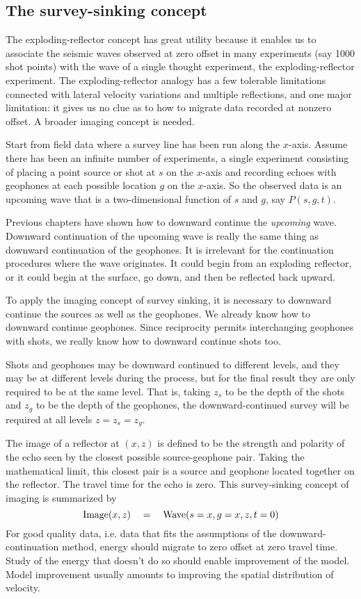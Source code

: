 \subsection{The survey-sinking concept}
\par
The exploding-reflector concept has great utility because it
enables us to associate the seismic waves
observed at zero offset in many experiments
(say 1000 shot points) with the wave of a single thought experiment,
the exploding-reflector experiment.
The exploding-reflector analogy has a
few tolerable limitations connected with lateral velocity
variations and multiple reflections,
and one major limitation:
it gives us no clue as to
how to migrate data recorded at nonzero offset.
A broader imaging concept is needed.
\par
Start from field data where a 
survey line has been run along the  $x$-axis.
Assume there has been an infinite number of experiments,
a single experiment consisting of placing  a point
source or shot at  $s$  on the $x$-axis and 
recording echoes with geophones
at each possible location  $g$  on the $x$-axis.
So the observed data is an upcoming wave that is a two-dimensional
function of  $s$  and  $g$,  say  $P(s,g,t)$.
\par
Previous chapters have shown how to downward continue the
{\em  upcoming}
wave.
Downward continuation of the upcoming wave is really the
same thing as downward continuation of the geophones.
It is irrelevant for the continuation procedures where the
wave originates.
It could begin from an exploding reflector,
or it could begin at the surface, go down, and then be reflected back upward.
\par
To apply the imaging concept of survey sinking,
it is necessary to downward continue the sources as well as the geophones.
We already know how to downward continue geophones.
Since reciprocity permits interchanging geophones with shots,
we really know how to downward continue shots too.
\par
Shots and geophones may be downward continued to different levels,
and they may be at different levels during the process,
but for the final result they are only required to be at the same level.
That is, taking  $ z_s $  to be the depth of the shots
and  $ z_g $  to be the depth of the
geophones, the downward-continued survey will be required at all
levels  $z = z_s = z_g $.  
\par
The image of a reflector at  $(x,z)$  is
defined to be the strength and
polarity of the echo seen by the
closest possible source-geophone pair.
Taking the mathematical limit, this 
closest pair is a source and geophone located
together on the reflector.
The travel time for the echo is zero.
This survey-sinking concept of imaging is summarized by
\begin{equation}
\hbox{Image} (x,z)   \ \ \  = \ \ \ \hbox{Wave} (s=x,g=x,z,t=0)
\label{eqn:3p1}
\end{equation}
For good quality data, i.e. data that fits the
assumptions of the downward-continuation method,
energy should migrate to zero offset at zero travel time.
Study of the energy that doesn't do so should enable improvement of the model.
Model improvement usually amounts to improving the
spatial distribution of velocity.

